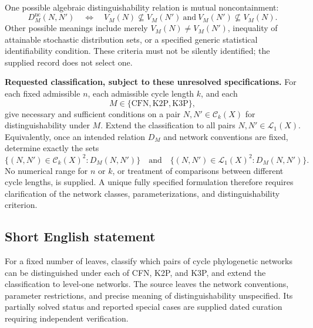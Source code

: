 \documentclass[11pt]{article}
\begin{document}
One possible algebraic distinguishability relation is mutual noncontainment:
\[
D_M^{\mathrm{nc}}(N,N')\quad\Longleftrightarrow\quad
V_M(N)\not\subseteq V_M(N')\ \text{and}\ V_M(N')\not\subseteq V_M(N).
\]
Other possible meanings include merely \(V_M(N)\neq V_M(N')\), inequality of attainable stochastic distribution sets, or a specified generic statistical identifiability condition. These criteria must not be silently identified; the supplied record does not select one.

\textbf{Requested classification, subject to these unresolved specifications.} For each fixed admissible \(n\), each admissible cycle length \(k\), and each
\[
M\in\{\mathrm{CFN},\mathrm{K2P},\mathrm{K3P}\},
\]
give necessary and sufficient conditions on a pair \(N,N'\in\mathcal C_k(X)\) for distinguishability under \(M\). Extend the classification to all pairs \(N,N'\in\mathcal L_1(X)\). Equivalently, once an intended relation \(D_M\) and network conventions are fixed, determine exactly the sets
\[
\{(N,N')\in\mathcal C_k(X)^2:D_M(N,N')\}
\quad\text{and}\quad
\{(N,N')\in\mathcal L_1(X)^2:D_M(N,N')\}.
\]
No numerical range for \(n\) or \(k\), or treatment of comparisons between different cycle lengths, is supplied. A unique fully specified formulation therefore requires clarification of the network classes, parameterizations, and distinguishability criterion.
\subsection{Short English statement}
For a fixed number of leaves, classify which pairs of cycle phylogenetic networks can be distinguished under each of CFN, K2P, and K3P, and extend the classification to level-one networks. The source leaves the network conventions, parameter restrictions, and precise meaning of distinguishability unspecified. Its partially solved status and reported special cases are supplied dated curation requiring independent verification.
\end{document}
